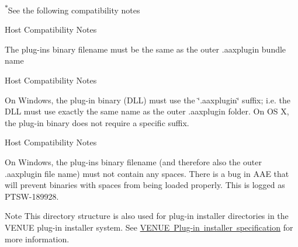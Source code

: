 \textsuperscript{$\ast$}See the following compatibility notes \begin{DoxyRefDesc}{Host Compatibility Notes}
\item[\mbox{\hyperlink{a00786__compatibility_notes000003}{Host Compatibility Notes}}]\end{DoxyRefDesc}
\begin{DoxyItemize}
\item The plug-\/in\textquotesingle{}s binary filename must be the same as the outer .aaxplugin bundle name \begin{DoxyRefDesc}{Host Compatibility Notes}
\item[\mbox{\hyperlink{a00786__compatibility_notes000004}{Host Compatibility Notes}}]\end{DoxyRefDesc}
\item On Windows, the plug-\/in binary (D\+LL) must use the \char`\"{}.\+aaxplugin\char`\"{} suffix; i.\+e. the D\+LL must use exactly the same name as the outer .aaxplugin folder. On OS X, the plug-\/in binary does not require a specific suffix. \begin{DoxyRefDesc}{Host Compatibility Notes}
\item[\mbox{\hyperlink{a00786__compatibility_notes000005}{Host Compatibility Notes}}]\end{DoxyRefDesc}
\item On Windows, the plug-\/in\textquotesingle{}s binary filename (and therefore also the outer .aaxplugin file name) must not contain any spaces. There is a bug in A\+AE that will prevent binaries with spaces from being loaded properly. This is logged as P\+T\+S\+W-\/189928.\end{DoxyItemize}
\begin{DoxyNote}{Note}
This directory structure is also used for plug-\/in installer directories in the V\+E\+N\+UE plug-\/in installer system. See \mbox{\hyperlink{a00849_aax_venue_guide__installer}{V\+E\+N\+UE Plug-\/in installer specification}} for more information.
\end{DoxyNote}



